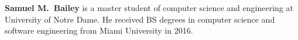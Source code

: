 \documentclass[letterpaper,twocolumn,fleqn]{article}
\begin{document}
\begin{biography}

\noindent \textbf{Samuel M.\ Bailey} is a master student of computer science and engineering at University of Notre Dame. He received BS degrees in computer science and software engineering from Miami University in 2016.\par \bigbreak

\end{biography}
\end{document}
